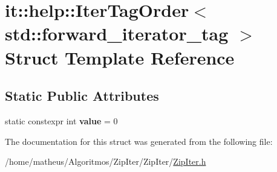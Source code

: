 \hypertarget{structit_1_1help_1_1IterTagOrder_3_01std_1_1forward__iterator__tag_01_4}{}\section{it\+:\+:help\+:\+:Iter\+Tag\+Order$<$ std\+:\+:forward\+\_\+iterator\+\_\+tag $>$ Struct Template Reference}
\label{structit_1_1help_1_1IterTagOrder_3_01std_1_1forward__iterator__tag_01_4}
\subsection*{Static Public Attributes}
\begin{DoxyCompactItemize}
\item 
static constexpr int {\bfseries value} = 0\hypertarget{structit_1_1help_1_1IterTagOrder_3_01std_1_1forward__iterator__tag_01_4_a34c7498d22b9af93b5106e9bc7de25f5}{}\label{structit_1_1help_1_1IterTagOrder_3_01std_1_1forward__iterator__tag_01_4_a34c7498d22b9af93b5106e9bc7de25f5}

\end{DoxyCompactItemize}


The documentation for this struct was generated from the following file\+:\begin{DoxyCompactItemize}
\item 
/home/matheus/\+Algoritmos/\+Zip\+Iter/\+Zip\+Iter/\hyperlink{ZipIter_8h}{Zip\+Iter.\+h}\end{DoxyCompactItemize}
